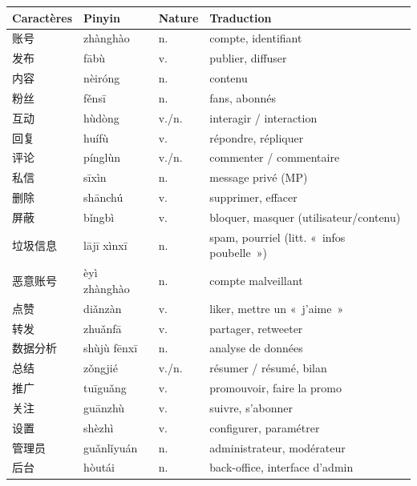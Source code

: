 \documentclass[11pt]{article}
\begin{document}
\begin{definition}
\begin{center}
\begin{tabularx}{\linewidth}{|X|X|X|X|}
\hline
\rowcolor{popblueL} \textbf{Caractères} & \textbf{Pinyin} & \textbf{Nature} & \textbf{Traduction} \\ \hline
账号 & zhànghào & n. & compte, identifiant \\ \hline
发布 & fābù & v. & publier, diffuser \\ \hline
内容 & nèiróng & n. & contenu \\ \hline
粉丝 & fěnsī & n. & fans, abonnés \\ \hline
互动 & hùdòng & v./n. & interagir / interaction \\ \hline
回复 & huífù & v. & répondre, répliquer \\ \hline
评论 & pínglùn & v./n. & commenter / commentaire \\ \hline
私信 & sīxìn & n. & message privé (MP) \\ \hline
删除 & shānchú & v. & supprimer, effacer \\ \hline
屏蔽 & bǐngbì & v. & bloquer, masquer (utilisateur/contenu) \\ \hline
垃圾信息 & lājī xìnxī & n. & spam, pourriel (litt. «~infos poubelle~») \\ \hline
恶意账号 & èyì zhànghào & n. & compte malveillant \\ \hline
点赞 & diǎnzàn & v. & liker, mettre un «~j'aime~» \\ \hline
转发 & zhuǎnfā & v. & partager, retweeter \\ \hline
数据分析 & shùjù fēnxī & n. & analyse de données \\ \hline
总结 & zǒngjié & v./n. & résumer / résumé, bilan \\ \hline
推广 & tuīguǎng & v. & promouvoir, faire la promo \\ \hline
关注 & guānzhù & v. & suivre, s'abonner \\ \hline
设置 & shèzhì & v. & configurer, paramétrer \\ \hline
管理员 & guǎnlǐyuán & n. & administrateur, modérateur \\ \hline
后台 & hòutái & n. & back-office, interface d'admin \\ \hline
\end{tabularx}
\end{center}
\end{definition}
\end{document}
